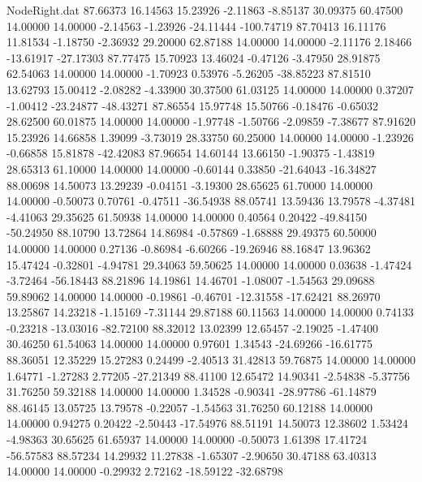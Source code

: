\begin{filecontents}{NodeRight.dat}
  87.66373   16.14563   15.23926    -2.11863   -8.85137   30.09375   60.47500   14.00000   14.00000   -2.14563   -1.23926  -24.11444 -100.74719
  87.70413   16.11176   11.81534    -1.18750   -2.36932   29.20000   62.87188   14.00000   14.00000   -2.11176    2.18466  -13.61917  -27.17303
  87.77475   15.70923   13.46024    -0.47126   -3.47950   28.91875   62.54063   14.00000   14.00000   -1.70923    0.53976   -5.26205  -38.85223
  87.81510   13.62793   15.00412    -2.08282   -4.33900   30.37500   61.03125   14.00000   14.00000    0.37207   -1.00412  -23.24877  -48.43271
  87.86554   15.97748   15.50766    -0.18476   -0.65032   28.62500   60.01875   14.00000   14.00000   -1.97748   -1.50766   -2.09859   -7.38677
  87.91620   15.23926   14.66858     1.39099   -3.73019   28.33750   60.25000   14.00000   14.00000   -1.23926   -0.66858   15.81878  -42.42083
  87.96654   14.60144   13.66150    -1.90375   -1.43819   28.65313   61.10000   14.00000   14.00000   -0.60144    0.33850  -21.64043  -16.34827
  88.00698   14.50073   13.29239    -0.04151   -3.19300   28.65625   61.70000   14.00000   14.00000   -0.50073    0.70761   -0.47511  -36.54938
  88.05741   13.59436   13.79578    -4.37481   -4.41063   29.35625   61.50938   14.00000   14.00000    0.40564    0.20422  -49.84150  -50.24950
  88.10790   13.72864   14.86984    -0.57869   -1.68888   29.49375   60.50000   14.00000   14.00000    0.27136   -0.86984   -6.60266  -19.26946
  88.16847   13.96362   15.47424    -0.32801   -4.94781   29.34063   59.50625   14.00000   14.00000    0.03638   -1.47424   -3.72464  -56.18443
  88.21896   14.19861   14.46701    -1.08007   -1.54563   29.09688   59.89062   14.00000   14.00000   -0.19861   -0.46701  -12.31558  -17.62421
  88.26970   13.25867   14.23218    -1.15169   -7.31144   29.87188   60.11563   14.00000   14.00000    0.74133   -0.23218  -13.03016  -82.72100
  88.32012   13.02399   12.65457    -2.19025   -1.47400   30.46250   61.54063   14.00000   14.00000    0.97601    1.34543  -24.69266  -16.61775
  88.36051   12.35229   15.27283     0.24499   -2.40513   31.42813   59.76875   14.00000   14.00000    1.64771   -1.27283    2.77205  -27.21349
  88.41100   12.65472   14.90341    -2.54838   -5.37756   31.76250   59.32188   14.00000   14.00000    1.34528   -0.90341  -28.97786  -61.14879
  88.46145   13.05725   13.79578    -0.22057   -1.54563   31.76250   60.12188   14.00000   14.00000    0.94275    0.20422   -2.50443  -17.54976
  88.51191   14.50073   12.38602     1.53424   -4.98363   30.65625   61.65937   14.00000   14.00000   -0.50073    1.61398   17.41724  -56.57583
  88.57234   14.29932   11.27838    -1.65307   -2.90650   30.47188   63.40313   14.00000   14.00000   -0.29932    2.72162  -18.59122  -32.68798

\end{filecontents}
